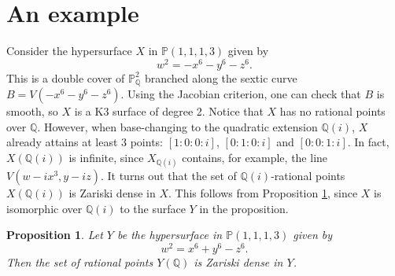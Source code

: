 \documentclass[11pt]{amsart}
\newcommand{\QQ}{\mathbb{Q}}
\newcommand{\PP}{\mathbb{P}}
\theoremstyle{plain}
\newtheorem{proposition}[lemma]{Proposition}
\theoremstyle{remark}
\begin{document}
\section{An example} \label{x6y6z6}
Consider the hypersurface $X$ in $\PP(1,1,1,3)$ given by
\[
w^2=-x^6-y^6-z^6.
\]
This is a double cover of $\PP^2_\QQ$ branched along the sextic curve $B=V(-x^6-y^6-z^6)$. Using the Jacobian criterion, one can check that $B$ is smooth, so $X$ is a K3 surface of degree 2. Notice that $X$ has no rational points over $\QQ$. However, when base-changing to the quadratic extension $\QQ(i)$, $X$ already attains at least 3 points: $[1:0:0:i]$, $[0:1:0:i]$ and $[0:0:1:i]$. In fact, $X(\QQ(i))$ is infinite, since $X_{\QQ(i)}$ contains, for example, the line $V(w-ix^3,y-iz)$. It turns out that the set of $\QQ(i)$-rational points $X(\QQ(i))$ is Zariski dense in $X$. This follows from Proposition \ref{denseratpts}, since $X$ is isomorphic over $\QQ(i)$ to the surface $Y$ in the proposition.

\begin{proposition} \label{denseratpts}
Let $Y$ be the hypersurface in $\PP(1,1,1,3)$ given by 
\[
w^2=x^6+ y^6-z^6. 
\]   
Then the set of rational points $Y(\QQ)$ is Zariski dense in $Y$. 
\end{proposition}
\end{document}
